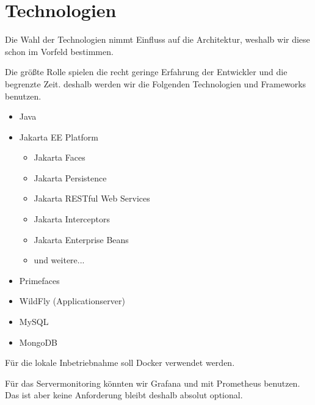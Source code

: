 
\clearpage

\section{Technologien}
Die Wahl der Technologien nimmt Einfluss auf die Architektur, weshalb wir diese schon im Vorfeld bestimmen. 

\vspace{6pt}

Die größte Rolle spielen die recht geringe Erfahrung der Entwickler und die begrenzte Zeit. deshalb werden wir die Folgenden Technologien und Frameworks benutzen.
\begin{itemize}
	\item Java
	\item Jakarta EE Platform
	\begin{itemize}
		\item Jakarta Faces
		\item Jakarta Persistence
		\item Jakarta RESTful Web Services
		\item Jakarta Interceptors
		\item Jakarta Enterprise Beans
		\item und weitere...
	\end{itemize}
	\item Primefaces
	\item WildFly (Applicationserver)
	\item MySQL
	\item MongoDB
\end{itemize}

\vspace{6pt}

Für die lokale Inbetriebnahme soll Docker verwendet werden.

\vspace{6pt}

Für das Servermonitoring könnten wir Grafana und mit Prometheus benutzen. Das ist aber keine Anforderung bleibt deshalb absolut optional. 